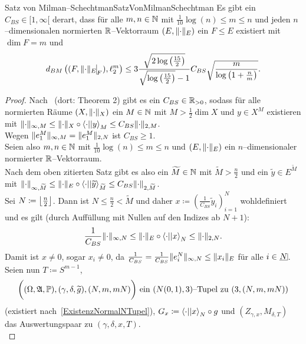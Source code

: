 \begin{satz}{Satz von Milman--Schechtman}{SatzVonMilmanSchechtman}
Es gibt ein $C_{BS} \in [1, \infty[$ derart, dass für alle $m, n \in \mathbb{N}$
mit $\frac 1 {10} \log(n) \le m \le n$ und jeden $n$--dimensionalen normierten
$\mathbb{R}$--Vektorraum $(E, \lVert\cdot\rVert_E)$ ein $F \le E$ existiert mit $\dim F = m$
und
\[d_{BM}\left((F, \restrict{\norm\cdot_E}F), \ell_2^m \right)
\le 3 \frac{\sqrt{2 \log\left(\frac {15}2 \right)}}
{\sqrt{\log\left(\frac {15}2 \right)} - 1}C_{BS}
\sqrt{\frac m {\log\left(1+ \frac n m \right)}}\text.\]
\end{satz}
\begin{proof}
Nach~\cite{BS} (dort: Theorem 2) gibt es ein $C_{BS} \in \mathbb{R}_{>0}$, sodass für
alle normierten Räume $(X, \lVert\cdot\rVert_X)$ ein $M \in \mathbb{N}$ mit
$M > \frac 1 2 \dim X$ und $y \in X^M$ existieren mit
$\lVert\cdot\rVert_{\infty,M}\le\lVert\cdot\rVert_X\circ\left\langle \cdot ||y\right\rangle_M
\le C_{BS}\lVert\cdot\rVert_{2,M}$.\\
Wegen $\lVert e_1^M\rVert_{\infty, M} = \lVert e_1^M\rVert_{2, N}$ ist $C_{BS} \ge 1$.\\
Seien also $m, n \in \mathbb{N}$ mit $\frac 1 {10} \log(n) \le m \le n$ und
$(E, \lVert\cdot\rVert_E)$ ein $n$--dimensionaler normierter $\mathbb{R}$--Vektorraum.\\
Nach dem oben zitierten Satz gibt es also ein $\widetilde M \in \mathbb{N}$ mit
$\widetilde M > \frac n 2$ und ein $\widetilde y \in E^{\widetilde M}$ mit
$\lVert\cdot\rVert_{\infty,\widetilde M}
\le\lVert\cdot\rVert_E\circ\left\langle \cdot ||\widetilde y\right\rangle_{\widetilde M}
\le C_{BS}\lVert\cdot\rVert_{2,\widetilde M}$.\\
Sei $N \coloneqq  \left\lfloor{\frac n 2}\right\rfloor$. Dann ist $N \le \frac n 2 < \widetilde M$ und
daher $x\coloneqq \left(\frac 1{C_{BS}}\widetilde y_i \right)_{i=1}^N$ wohldefiniert
und es gilt (durch Auffüllung mit Nullen auf den Indizes ab $N+1$):
\begin{align}\frac 1{C_{BS}}
\lVert\cdot\rVert_{\infty, N} \le \lVert\cdot\rVert_E \circ \left\langle \cdot ||x\right\rangle_N \le
\lVert\cdot\rVert_{2,N} \text.\label{svmseq:1}\end{align}
Damit ist $x \neq 0$, sogar $x_i \neq 0$, da
$\frac 1 {C_{BS}} = \frac 1 {C_{BS}} \lVert e_i^N\rVert_{\infty,N} \le \lVert x_i\rVert_E$
für alle $i \in \haken N$.\\
Seien nun $T\coloneqq S^{m-1}$,
\[\bigg((\Omega, \mathfrak{A}, \mathbb{P}), (\gamma,\delta,\widetilde g),(N, m, mN)\bigg)
\text{ ein }(N(0,1), 3)\text{--Tupel zu }(3,(N,m,mN))\] (existiert nach~\ref{ExistenzNormalNTupel}), $G_x \coloneqq  \left\langle \cdot ||x\right\rangle_N \circ g$ und $(Z_{\gamma, x}, M_{\delta,T})$ das
Auswertungspaar zu $(\gamma, \delta, x, T)$.\\

\end{proof}
